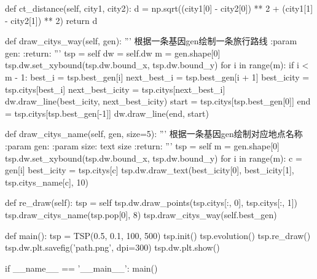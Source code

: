 \documentclass{ctexart}
\begin{document}
\begin{python}
    def ct_distance(self, city1, city2):
        d = np.sqrt((city1[0] - city2[0]) ** 2 + (city1[1] - city2[1]) ** 2)
        return d

    def draw_citys_way(self, gen):
        '''
        根据一条基因gen绘制一条旅行路线
        :param gen:
        :return:
        '''
        tsp = self
        dw = self.dw
        m = gen.shape[0]
        tsp.dw.set_xybound(tsp.dw.bound_x, tsp.dw.bound_y)
        for i in range(m):
            if i < m - 1:
                best_i = tsp.best_gen[i]
                next_best_i = tsp.best_gen[i + 1]
                best_icity = tsp.citys[best_i]
                next_best_icity = tsp.citys[next_best_i]
                dw.draw_line(best_icity, next_best_icity)
        start = tsp.citys[tsp.best_gen[0]]
        end = tsp.citys[tsp.best_gen[-1]]
        dw.draw_line(end, start)

    def draw_citys_name(self, gen, size=5):
        '''
        根据一条基因gen绘制对应地点名称
        :param gen:
        :param size: text size
        :return:
        '''
        tsp = self
        m = gen.shape[0]
        tsp.dw.set_xybound(tsp.dw.bound_x, tsp.dw.bound_y)
        for i in range(m):
            c = gen[i]
            best_icity = tsp.citys[c]
            tsp.dw.draw_text(best_icity[0], best_icity[1], tsp.citys_name[c], 10)

    def re_draw(self):
        tsp = self
        tsp.dw.draw_points(tsp.citys[:, 0], tsp.citys[:, 1])
        tsp.draw_citys_name(tsp.pop[0], 8)
        tsp.draw_citys_way(self.best_gen)


def main():
    tsp = TSP(0.5, 0.1, 100, 500)
    tsp.init()
    tsp.evolution()
    tsp.re_draw()
    tsp.dw.plt.savefig('path.png', dpi=300)
    tsp.dw.plt.show()


if __name__ == '__main__':
    main()

    \end{python}
\end{document}
